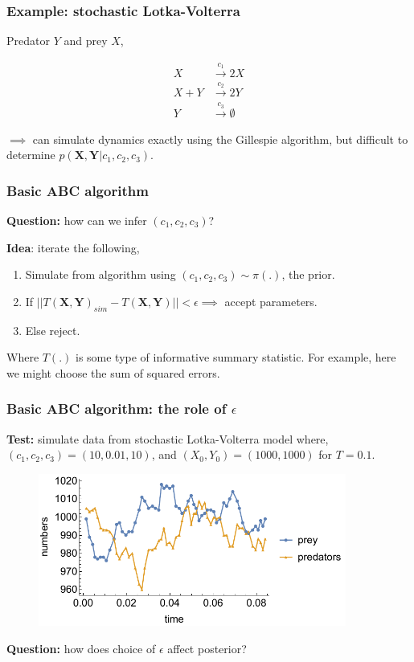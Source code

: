 \documentclass[handout]{beamer}
\begin{document}
\begin{frame}
	\frametitle{Example: stochastic Lotka-Volterra}
	Predator $Y$ and prey $X$,
	
	\begin{align}
	X &\xrightarrow{c_1} 2 X\\ 
	X + Y &\xrightarrow{c_2} 2Y\\
	Y &\xrightarrow{c_3} \emptyset
	\end{align}
	
	$\implies$ can simulate dynamics exactly using the Gillespie algorithm, but difficult to determine $p(\boldsymbol{X},\boldsymbol{Y}|c_1,c_2,c_3)$.
	
\end{frame}

\begin{frame}
	\frametitle{Basic ABC algorithm}
	\textbf{Question:} how can we infer $(c_1,c_2,c_3)$?
	
	\vspace{0.2cm}
	
	 \textbf{Idea}: iterate the following, 
	\begin{enumerate}
		\item<3-> Simulate from algorithm using $(c_1,c_2,c_3)\sim \pi(.)$, the prior.
		\item<4-> If $||T\boldsymbol{(X,Y)}_{sim} - T\boldsymbol{(X,Y)}||<\epsilon \implies$ accept parameters.
		\item<5-> Else reject.
	\end{enumerate}
	
	Where $T(.)$ is some type of informative summary statistic. For example, here we might choose the sum of squared errors.
	
\end{frame}

\begin{frame}
	\frametitle{Basic ABC algorithm: the role of $\epsilon$}
	\textbf{Test:} simulate data from stochastic Lotka-Volterra model where, $(c_1,c_2,c_3) = (10,0.01,10)$, and $(X_0,Y_0) = (1000,1000)$ for $T=0.1$.
	
	\begin{figure}[ht]
		\centerline{\includegraphics[width=0.9\textwidth]{animations_figures/predatorPrey.pdf}}
	\end{figure}
	
	\textbf{Question:} how does choice of $\epsilon$ affect posterior?
	
\end{frame}
\end{document}

